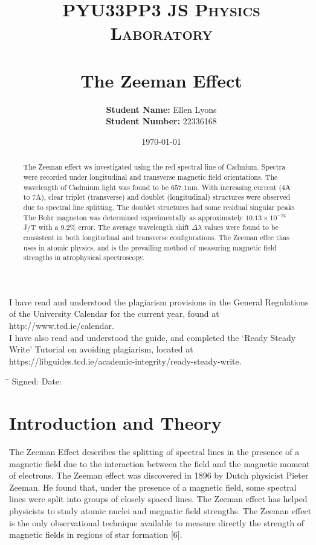 \documentclass[11pt,twocolumn, a4paper]{article}
\title{	
\normalfont \normalsize 
\textsc{PYU33PP3 JS Physics Laboratory} \\ [25pt] 
\horrule{0.5pt} \\[0.4cm] 
\LARGE \textbf{The Zeeman Effect} \\ 
}
\author{\textbf{Student Name:} Ellen Lyons \\ \textbf{Student Number:} 22336168}
\date{\normalsize\today}
\numberwithin{equation}{section} %
\numberwithin{figure}{section} %
\numberwithin{table}{section} %
\begin{document}
\onecolumn
\maketitle 
\small{I have read and understood the plagiarism provisions in the General Regulations of the University Calendar for the current year, found at http://www.tcd.ie/calendar.\\
I have also read and understood the guide, and completed the ‘Ready Steady Write’ Tutorial on avoiding plagiarism, located at https://libguides.tcd.ie/academic-integrity/ready-steady-write.}
\begin{tabbing}
\hspace{10cm} \= \kill
Signed: \underline{\hspace{5cm}} 
Date: \underline{\hspace{3cm}}
\end{tabbing}

\vspace{1cm}

\begin{abstract}
    The Zeeman effect ws investigated using the red spectral line of Cadmium. Spectra were recorded under longitudinal and transverse magnetic field orientations. The wavelength of Cadmium light was found to be \(657.1\)nm. With increasing current (4A to 7A), clear triplet (transverse) and doublet (longitudinal) structures were observed due to spectral line splitting. The doublet structures had some residual singular peaks The Bohr magneton was determined experimentally as approximately \(10.13 \times 10^{-24}\) J/T with a 9.2\% error. The average wavelength shift \(\Delta \lambda\) values were found to be consistent in both longitudinal and transverse configurations. The Zeeman effec thas uses in atomic physics, and is the prevailing method of measuring magnetic field strengths in atrophysical spectroscopy.
\end{abstract}
\newpage
\tableofcontents
\section{Introduction and Theory}
The Zeeman Effect describes the splitting of spectral lines in the presence of a magnetic field due to the interaction between the field and the magnetic moment of electrons. The Zeeman effect was discovered in 1896 by Dutch physicist Pieter Zeeman. He found that, under the presence of a magnetic field, some spectral lines were split into groups of closely spaced lines. The Zeeman effect has helped physicists to study atomic nuclei and megnatic field strengths. The Zeeman effect is the only observational technique available to measure directly the strength of magnetic fields in regions of star formation [6].
\\
\end{document}
